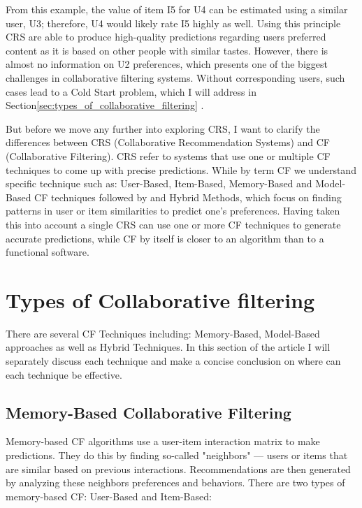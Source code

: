 \documentclass[10pt,a4paper]{article}
\begin{document}
\hspace{0.5cm}

From this example, the value of item I5 for U4 can be estimated using a similar user, U3; therefore, U4 would likely rate I5 highly as well. Using this principle CRS are able to produce high-quality predictions regarding users preferred content as it is based on other people with similar tastes. However, there is almost no information on U2 preferences, which presents one of the biggest challenges in collaborative filtering systems. Without corresponding users, such cases lead to a Cold Start problem, which I will address in Section\ref{sec:types_of_collaborative_filtering} \cite{5283866}.

\hspace{0.5cm}

But before we move any further into exploring CRS, I want to clarify the differences between CRS (Collaborative Recommendation Systems) and CF (Collaborative Filtering). CRS refer to systems that use one or multiple CF techniques to come up with precise predictions. While by term CF we understand specific technique such as: User-Based, Item-Based, Memory-Based and Model-Based CF techniques followed by and Hybrid Methods, which focus on finding patterns in user or item similarities to predict one's preferences. Having taken this into account a single CRS can use one or more CF techniques to generate accurate predictions, while CF by itself is closer to an algorithm than to a functional software.


\section{Types of Collaborative filtering}

There are several CF Techniques including: Memory-Based, Model-Based approaches as well as Hybrid Techniques. In this section of the article I will separately discuss each technique and make a concise conclusion on where can each technique be effective.

\subsection{Memory-Based Collaborative Filtering}
Memory-based CF algorithms use a user-item interaction matrix to make predictions. They do this by finding so-called "neighbors" — users or items that are similar based on previous interactions. Recommendations are then generated by analyzing these neighbors preferences and behaviors. There are two types of memory-based CF: User-Based and Item-Based:
\end{document}
